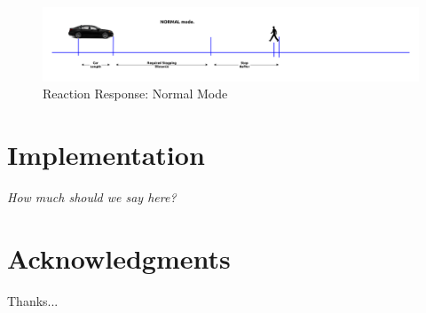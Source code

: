 \documentclass[letterpaper, 10 pt, conference]{ieeeconf}  %
\begin{document}
\begin{figure}[thpb]
  \centering
  \includegraphics[width=1.0\columnwidth]{graphics/RSTOP_NORMAL_time_to_stop.png}
  \caption{Reaction Response: Normal Mode}
  \label{fig:7phaseprofile}
\end{figure}



           
\section{Implementation}

\emph{How much should we say here?}

\section*{Acknowledgments}

Thanks...




\end{document}
